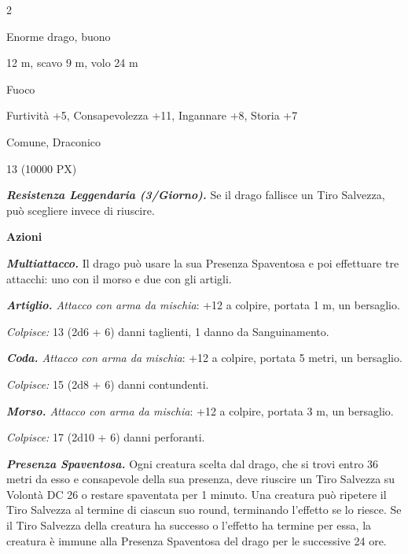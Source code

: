 \begin{multicols}{2}
{
\begin{description}[noitemsep, topsep=0pt, parsep=0pt, partopsep=0pt, itemsep=1pt, leftmargin=2.35cm,  labelwidth=2.2cm, itemindent=0cm, listparindent=0pt] %
\setlength{\baselineskip}{10pt}
\item[\textbf{Taglia/Tipo}] Enorme drago, buono
\item[\textbf{Caratt.}] 
\item[\textbf{Punti Ferita}] 
\item[\textbf{Movimento}] 12 m, scavo 9 m, volo 24 m
\item[\textbf{Tiri Salvez.}] 
\item[\textbf{Imm. Danni}] Fuoco
\item[\textbf{Comp.}] Furtività +5, Consapevolezza +11, Ingannare +8, Storia +7
\item[\textbf{Sensi}] 
\item[\textbf{Linguaggi}] Comune, Draconico
\item[\textbf{Sfida}] 13 (10000 PX)
\end{description}
\smallskip

\emph{\textbf{Resistenza Leggendaria (3/Giorno).}} Se il drago fallisce un Tiro Salvezza, può scegliere invece di riuscire.

\textbf{Azioni}

\emph{\textbf{Multiattacco.}} Il drago può usare la sua Presenza Spaventosa e poi effettuare tre attacchi: uno con il morso e due con gli artigli.

\emph{\textbf{Artiglio.} Attacco con arma da mischia}: +12 a colpire, portata 1 m, un bersaglio.

\emph{Colpisce:} 13 (2d6 + 6) danni taglienti, 1 danno da Sanguinamento.

\emph{\textbf{Coda.} Attacco con arma da mischia}: +12 a colpire, portata 5 metri, un bersaglio.

\emph{Colpisce:} 15 (2d8 + 6) danni contundenti.

\emph{\textbf{Morso.} Attacco con arma da mischia}: +12 a colpire, portata 3 m, un bersaglio.

\emph{Colpisce:} 17 (2d10 + 6) danni perforanti.

\emph{\textbf{Presenza Spaventosa.}} Ogni creatura scelta dal drago, che si trovi entro 36 metri da esso e consapevole della sua presenza, deve riuscire un Tiro Salvezza su Volontà DC 26 o restare spaventata per 1 minuto. Una creatura può ripetere il Tiro Salvezza al termine di ciascun suo round, terminando l'effetto se lo riesce. Se il Tiro Salvezza della creatura ha successo o l'effetto ha termine per essa, la creatura è immune alla Presenza Spaventosa del drago per le successive 24 ore.

}
\end{multicols}
